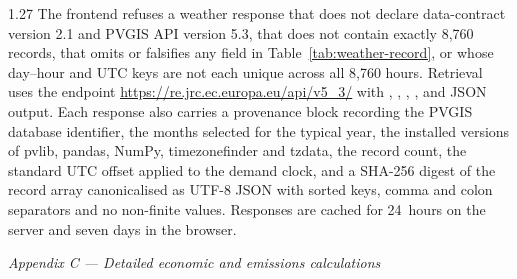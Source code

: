 \documentclass[12pt,letterpaper]{article}
\newcommand{\weblink}[1]{\textcolor{blue}{\underline{\url{#1}}}}
\newcommand{\referenceheading}[1]{\vspace{1.55em}\textit{#1}\par\vspace{0.45em}}
\begin{document}
\begin{spacing}{1.27}
The frontend refuses a weather response that does not declare data-contract version 2.1 and PVGIS API version 5.3, that does not contain exactly 8,760 records, that omits or falsifies any field in Table~\ref{tab:weather-record}, or whose day--hour and UTC keys are not each unique across all 8,760 hours. Retrieval uses the endpoint \weblink{https://re.jrc.ec.europa.eu/api/v5_3/} with , , , ,  and JSON output. Each response also carries a provenance block recording the PVGIS database identifier, the months selected for the typical year, the installed versions of pvlib, pandas, NumPy, timezonefinder and tzdata, the record count, the standard UTC offset applied to the demand clock, and a SHA-256 digest of the record array canonicalised as UTF-8 JSON with sorted keys, comma and colon separators and no non-finite values. Responses are cached for 24~hours on the server and seven days in the browser.\par
\end{spacing}

\referenceheading{Appendix C --- Detailed economic and emissions calculations}
\end{document}
